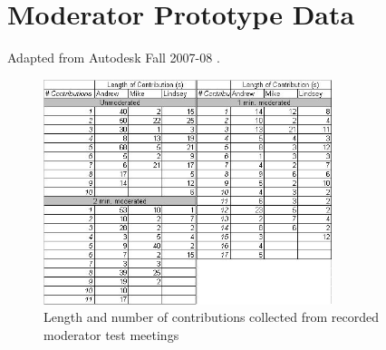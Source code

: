 \chapter{Moderator Prototype Data}
\label{sec:Appendix1}
Adapted from Autodesk Fall 2007-08 \cite{Autodesk2008Fall}.

\begin{figure}
	\centering
		\includegraphics[width=0.75\textwidth]{Figures/Appendix1/moderatordata.JPG}
	\caption[test meetings data]{Length and number of contributions collected from recorded moderator test meetings}
	\label{fig:moderatordata}
\end{figure}
